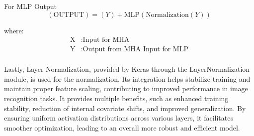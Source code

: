 For MLP Output
\begin{equation}
    (\text{OUTPUT}) = (Y) + \text{MLP} (\text{Normalization} (Y)) \label{eq:mlp_output}
\end{equation}

where:
\begin{align*}
    \text{X} & : \text{Input for MHA}                 \\
    \text{Y} & : \text{Output from MHA Input for MLP} \\
\end{align*}

Lastly, Layer Normalization, provided by Keras through the LayerNormalization module, is used for the normalization. Its integration helps stabilize training and maintain proper feature scaling, contributing to improved performance in image recognition tasks. It provides multiple benefits, such as enhanced training stability, reduction of internal covariate shifts, and improved generalization. By ensuring uniform activation distributions across various layers, it facilitates smoother optimization, leading to an overall more robust and efficient model.

\newpage